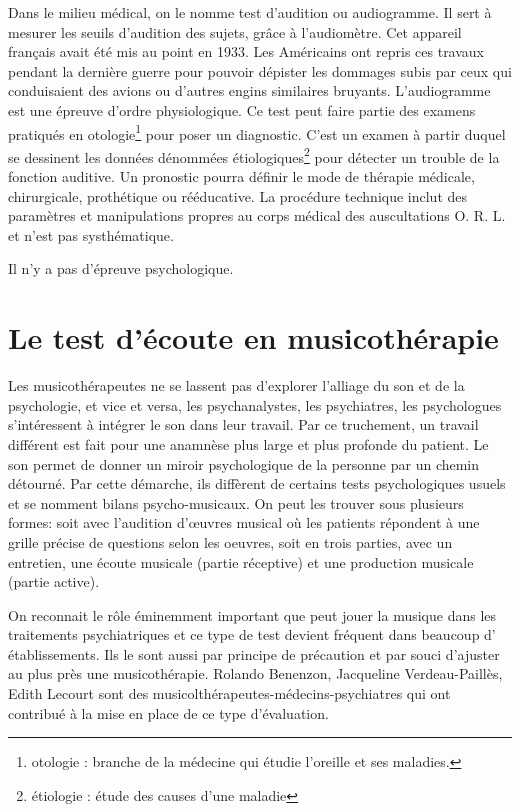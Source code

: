 Dans le milieu médical, on le nomme test d'audition ou audiogramme. Il
sert à mesurer les seuils d'audition des sujets, grâce à l'audiomètre. Cet 
appareil français avait été mis au point en 1933. Les Américains
ont repris ces travaux pendant la dernière guerre pour pouvoir dépister
les dommages subis par ceux qui conduisaient des avions ou d'autres
engins similaires bruyants.
  L'audiogramme est une épreuve d'ordre physiologique. Ce test peut faire partie des examens  pratiqués en otologie\footnote{otologie : branche de la médecine
  	qui étudie l'oreille et ses maladies.} pour poser un diagnostic. 
   C'est un examen à partir duquel se
  dessinent les données dénommées étiologiques\footnote{étiologie : étude des causes
  	d'une maladie} pour détecter un trouble de la fonction auditive. Un pronostic pourra définir le mode de thérapie
médicale, chirurgicale, prothétique ou rééducative. La procédure
technique inclut des paramètres et manipulations propres au corps
médical des auscultations O. R. L. et  n'est pas systhématique.

Il n'y a pas d'épreuve psychologique. 




\chapter{Le test d'écoute en musicothérapie}

Les musicothérapeutes ne se lassent pas d'explorer l'alliage du son
 et de la psychologie, et vice
 et versa, les psychanalystes, les psychiatres, les psychologues
 s'intéressent à intégrer le son dans leur travail. Par ce truchement,
 un travail différent est fait pour une anamnèse plus large et
 plus profonde du patient. Le son permet de donner un miroir
 psychologique de la personne par un chemin détourné. Par cette
 démarche, ils diffèrent de certains tests psychologiques usuels
 et se nomment bilans psycho-musicaux. On peut les trouver sous
 plusieurs formes: soit avec l'audition d'\oe uvres
 musical où les patients répondent à une grille précise de questions
 selon les oeuvres, soit en trois parties, avec un entretien,
 une écoute musicale (partie réceptive) et une production musicale
 (partie active).

 
 On reconnait le rôle éminemment important que peut jouer la musique
 dans les traitements psychiatriques et ce type de test devient
 fréquent dans beaucoup d' établissements. Ils le sont aussi  par principe de précaution et
 par souci d'ajuster au plus près une
 musicothérapie. Rolando Benenzon, Jacqueline Verdeau-Paillès, Edith
 Lecourt sont des musicolthérapeutes-médecins-psychiatres qui ont contribué à la mise en place de ce
 type d'évaluation.

